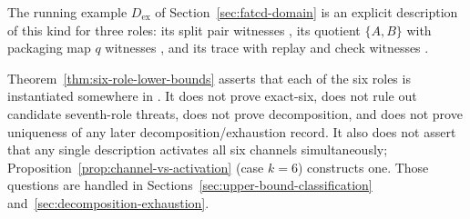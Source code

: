 The running example \(D_{\mathrm{ex}}\) of Section~\ref{sec:fatcd-domain}
is an explicit description of this kind for three roles: its split pair
witnesses \Pone{}, its quotient \(\{A,B\}\) with packaging map \(q\)
witnesses \Pfive{}, and its trace with replay and check witnesses \Psix{}.

\begin{remark}\label{rem:lower-bounds-scope}
Theorem~\ref{thm:six-role-lower-bounds} asserts that each of the six
roles is instantiated somewhere in \FATCD{}. It does not prove
exact-six, does not rule out candidate seventh-role threats, does not
prove decomposition, and does not prove uniqueness of any later
decomposition/exhaustion record. It also does not assert that any
single description activates all six channels simultaneously;
Proposition~\ref{prop:channel-vs-activation} (case \(k=6\)) constructs one. Those
questions are handled in
Sections~\ref{sec:upper-bound-classification}
and~\ref{sec:decomposition-exhaustion}.
\end{remark}
